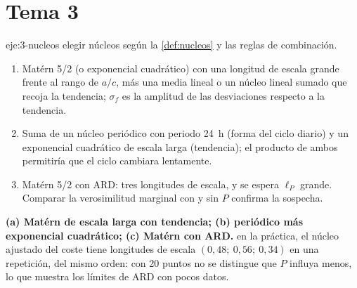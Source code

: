 \section{Tema 3}

\begin{solucion}{eje:3-nucleos}
\planteamiento elegir núcleos según la \cref{def:nucleos} y las reglas de combinación.
\pasos
\begin{enumerate}[label=(\alph*)]
  \item Matérn 5/2 (o exponencial cuadrático) con una longitud de escala grande frente al rango de $a/c$, más una media lineal o un núcleo lineal sumado que recoja la tendencia; $\sigma_f$ es la amplitud de las desviaciones respecto a la tendencia.
  \item Suma de un núcleo periódico con periodo 24~h (forma del ciclo diario) y un exponencial cuadrático de escala larga (tendencia); el producto de ambos permitiría que el ciclo cambiara lentamente.
  \item Matérn 5/2 con ARD: tres longitudes de escala, y se espera $\ell_P$ grande. Comparar la verosimilitud marginal con y sin $P$ confirma la sospecha.
\end{enumerate}
\resultado \textbf{(a) Matérn de escala larga con tendencia; (b) periódico más exponencial cuadrático; (c) Matérn con ARD.}
\comprobacion en la práctica, el núcleo ajustado del coste tiene longitudes de escala $(0{,}48;\ 0{,}56;\ 0{,}34)$ en una repetición, del mismo orden: con 20 puntos no se distingue que $P$ influya menos, lo que muestra los límites de ARD con pocos datos.
\end{solucion}

